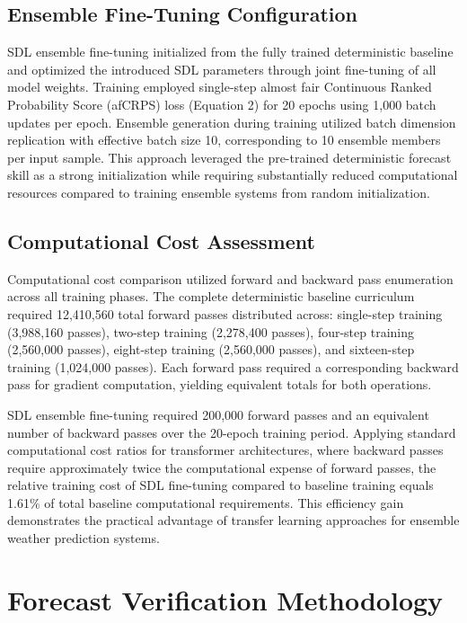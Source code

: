 \documentclass{agujournal2019}
\begin{document}
\subsection{Ensemble Fine-Tuning Configuration}

SDL ensemble fine-tuning initialized from the fully trained deterministic baseline and optimized the introduced SDL parameters through joint fine-tuning of all model weights. Training employed single-step almost fair Continuous Ranked Probability Score (afCRPS) loss (Equation 2) for 20 epochs using 1,000 batch updates per epoch. Ensemble generation during training utilized batch dimension replication with effective batch size 10, corresponding to 10 ensemble members per input sample. This approach leveraged the pre-trained deterministic forecast skill as a strong initialization while requiring substantially reduced computational resources compared to training ensemble systems from random initialization.

\subsection{Computational Cost Assessment}

Computational cost comparison utilized forward and backward pass enumeration across all training phases. The complete deterministic baseline curriculum required 12,410,560 total forward passes distributed across: single-step training (3,988,160 passes), two-step training (2,278,400 passes), four-step training (2,560,000 passes), eight-step training (2,560,000 passes), and sixteen-step training (1,024,000 passes). Each forward pass required a corresponding backward pass for gradient computation, yielding equivalent totals for both operations.

SDL ensemble fine-tuning required 200,000 forward passes and an equivalent number of backward passes over the 20-epoch training period. Applying standard computational cost ratios for transformer architectures, where backward passes require approximately twice the computational expense of forward passes, the relative training cost of SDL fine-tuning compared to baseline training equals 1.61\% of total baseline computational requirements. This efficiency gain demonstrates the practical advantage of transfer learning approaches for ensemble weather prediction systems.

\section{Forecast Verification Methodology}
\label{sec:skill_details}
\end{document}
